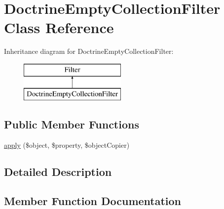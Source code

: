\hypertarget{class_deep_copy_1_1_filter_1_1_doctrine_1_1_doctrine_empty_collection_filter}{}\section{Doctrine\+Empty\+Collection\+Filter Class Reference}
\label{class_deep_copy_1_1_filter_1_1_doctrine_1_1_doctrine_empty_collection_filter}
Inheritance diagram for Doctrine\+Empty\+Collection\+Filter\+:\begin{figure}[H]
\begin{center}
\leavevmode
\includegraphics[height=2.000000cm]{class_deep_copy_1_1_filter_1_1_doctrine_1_1_doctrine_empty_collection_filter}
\end{center}
\end{figure}
\subsection*{Public Member Functions}
\begin{DoxyCompactItemize}
\item 
\mbox{\hyperlink{class_deep_copy_1_1_filter_1_1_doctrine_1_1_doctrine_empty_collection_filter_a360932fe7f9488472623d76aa7da2a25}{apply}} (\$object, \$property, \$object\+Copier)
\end{DoxyCompactItemize}


\subsection{Detailed Description}


\subsection{Member Function Documentation}
\mbox{\label{class_deep_copy_1_1_filter_1_1_doctrine_1_1_doctrine_empty_collection_filter_a360932fe7f9488472623d76aa7da2a25}} 
